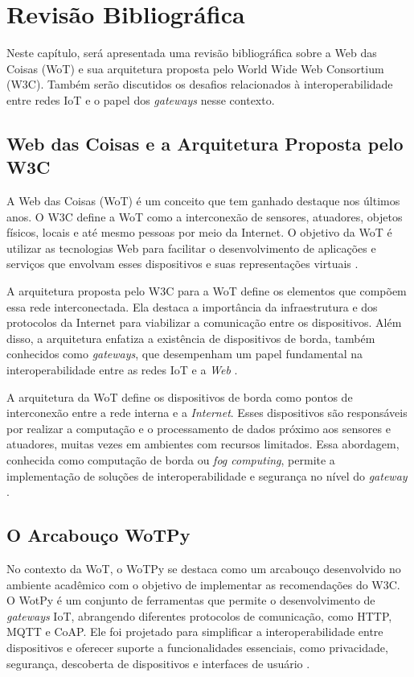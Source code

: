 \chapter{Revisão Bibliográfica}

Neste capítulo, será apresentada uma revisão bibliográfica sobre a Web das Coisas (WoT) e sua arquitetura proposta pelo World Wide Web Consortium (W3C). Também serão discutidos os desafios relacionados à interoperabilidade entre redes IoT e o papel dos \textit{gateways} nesse contexto. 

\section{Web das Coisas e a Arquitetura Proposta pelo W3C}

A Web das Coisas (WoT) é um conceito que tem ganhado destaque nos últimos anos. O W3C define a WoT como a interconexão de sensores, atuadores, objetos físicos, locais e até mesmo pessoas por meio da Internet. O objetivo da WoT é utilizar as tecnologias Web para facilitar o desenvolvimento de aplicações e serviços que envolvam esses dispositivos e suas representações virtuais \cite{WoTTerminology, WoTCommunityWiki}.

A arquitetura proposta pelo W3C para a WoT define os elementos que compõem essa rede interconectada. Ela destaca a importância da infraestrutura e dos protocolos da Internet para viabilizar a comunicação entre os dispositivos. Além disso, a arquitetura enfatiza a existência de dispositivos de borda, também conhecidos como \textit{gateways}, que desempenham um papel fundamental na interoperabilidade entre as redes IoT e a \textit{Web} \cite{Matsukura:23:WTA}.

A arquitetura da WoT define os dispositivos de borda como pontos de interconexão entre a rede interna e a \textit{Internet}. Esses dispositivos são responsáveis por realizar a computação e o processamento de dados próximo aos sensores e atuadores, muitas vezes em ambientes com recursos limitados. Essa abordagem, conhecida como computação de borda ou \textit{fog computing}, permite a implementação de soluções de interoperabilidade e segurança no nível do \textit{gateway} \cite{Stirbu2008, Gyrard2017, GARCIAMANGAS2019235}.

\section{O Arcabouço WoTPy}

No contexto da WoT, o WoTPy se destaca como um arcabouço desenvolvido no ambiente acadêmico com o objetivo de implementar as recomendações do W3C. O WotPy é um conjunto de ferramentas que permite o desenvolvimento de \textit{gateways} IoT, abrangendo diferentes protocolos de comunicação, como HTTP, MQTT e CoAP. Ele foi projetado para simplificar a interoperabilidade entre dispositivos e oferecer suporte a funcionalidades essenciais, como privacidade, segurança, descoberta de dispositivos e interfaces de usuário \cite{GARCIAMANGAS2019235}.

